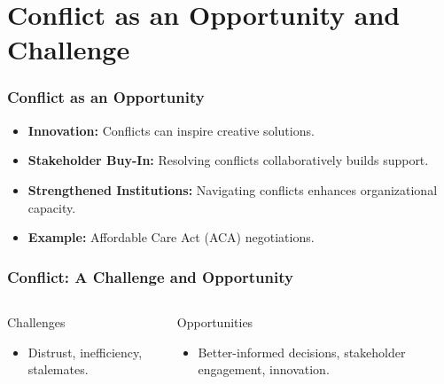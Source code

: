 \documentclass[10pt]{beamer}
\begin{document}
        \section{Conflict as an Opportunity and Challenge}
        
        \begin{frame}
        \frametitle{Conflict as an Opportunity}
        \begin{itemize}
            \item \textbf{Innovation:} Conflicts can inspire creative solutions.
            \item \textbf{Stakeholder Buy-In:} Resolving conflicts collaboratively builds support.
            \item \textbf{Strengthened Institutions:} Navigating conflicts enhances organizational capacity.
            \item \textbf{Example:} Affordable Care Act (ACA) negotiations.
        \end{itemize}
        \end{frame}
        
        \begin{frame}
        \frametitle{Conflict: A Challenge and Opportunity}
        \begin{columns}[T,onlytextwidth]
            \begin{block}{Challenges}
                \begin{itemize}
                    \item Distrust, inefficiency, stalemates.
                \end{itemize}
            \end{block}
            \begin{block}{Opportunities}
                \begin{itemize}
                    \item Better-informed decisions, stakeholder engagement, innovation.
                \end{itemize}
            \end{block}
        \end{columns}
        \end{frame}
        
\end{document}
